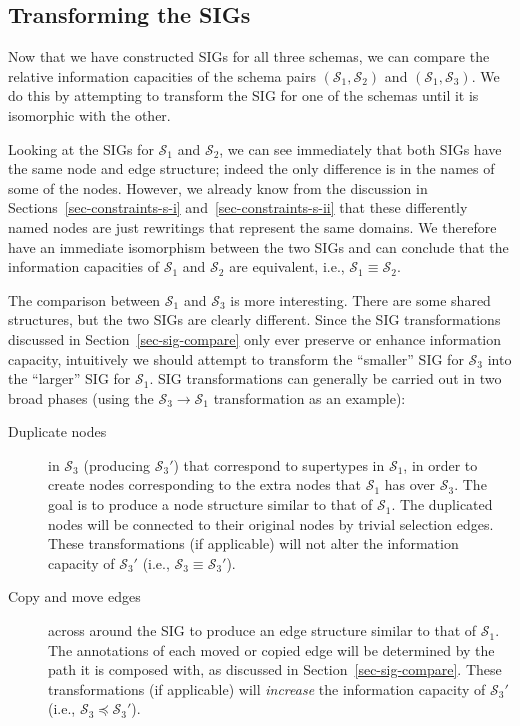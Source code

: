 \documentclass{sig-alternate-05-2015}
\newcounter{constraint}
\newcommand{\SC}[1]{\ensuremath{\mathcal{S}_{#1}}}
\newcommand{\Dominates}[2]{\ensuremath{#2 \preceq #1}}
\newcommand{\Equivalent}[2]{\ensuremath{#1 \equiv #2}}
\begin{document}
\subsection{Transforming the SIGs}
\label{sec-transforming}

\noindent Now that we have constructed SIGs for all three schemas, we can compare the relative information capacities of the schema pairs \((\SC{1}, \SC{2})\) and \((\SC{1}, \SC{3})\). We do this by attempting to transform the SIG for one of the schemas until it is isomorphic with the other.

Looking at the SIGs for \(\SC{1}\) and \(\SC{2}\), we can see immediately that both SIGs have the same node and edge structure; indeed the only difference is in the names of some of the nodes. However, we already know from the discussion in Sections~\ref{sec-constraints-s-i} and~\ref{sec-constraints-s-ii} that these differently named nodes are just rewritings that represent the same domains. We therefore have an immediate isomorphism between the two SIGs and can conclude that the information capacities of \(\SC{1}\) and \(\SC{2}\) are equivalent, i.e., \(\Equivalent{\SC{1}}{\SC{2}}\).

The comparison between \(\SC{1}\) and \(\SC{3}\) is more interesting. There are some shared structures, but the two SIGs are clearly different. Since the SIG transformations discussed in Section~\ref{sec-sig-compare} only ever preserve or enhance information capacity, intuitively we should attempt to transform the ``smaller'' SIG for \(\SC{3}\) into the ``larger'' SIG for \(\SC{1}\). SIG transformations can generally be carried out in two broad phases (using the \(\SC{3} \rightarrow \SC{1}\) transformation as an example):
\begin{description}

    \item[Duplicate nodes] in \(\SC{3}\) (producing \(\SC{3}'\)) that correspond to supertypes in \(\SC{1}\), in order to create nodes corresponding to the extra nodes that \(\SC{1}\) has over \(\SC{3}\). The goal is to produce a node structure similar to that of \(\SC{1}\). The duplicated nodes will be connected to their original nodes by trivial selection edges. These transformations (if applicable) will not alter the information capacity of \(\SC{3}'\) (i.e., \(\Equivalent{\SC{3}}{\SC{3}'}\)).
    
    \item[Copy and move edges] across around the SIG to produce an edge structure similar to that of \(\SC{1}\). The annotations of each moved or copied edge will be determined by the path it is composed with, as discussed in Section~\ref{sec-sig-compare}. These transformations (if applicable) will \emph{increase} the information capacity of \(\SC{3}'\) (i.e., \(\Dominates{\SC{3}'}{\SC{3}}\)).
    
\end{description}
\end{document}
